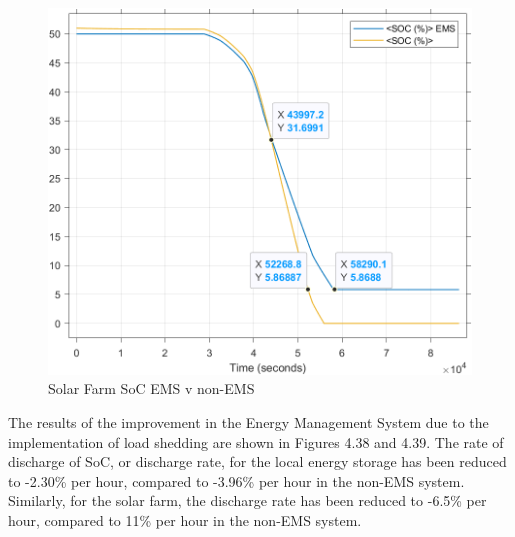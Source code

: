 \begin{figure}[H]
	\centering
	\includegraphics[totalheight=8cm]{Figures/solar farm soc ems v non-ems2.png}
	\caption{Solar Farm SoC EMS v non-EMS}
\end{figure}
The results of the improvement in the Energy Management System due to the implementation of load shedding are shown in Figures 4.38 and 4.39. The rate of discharge of SoC, or discharge rate, for the local energy storage has been reduced to -2.30\% per hour, compared to -3.96\% per hour in the non-EMS system. Similarly, for the solar farm, the discharge rate has been reduced to -6.5\% per hour, compared to 11\% per hour in the non-EMS system.

